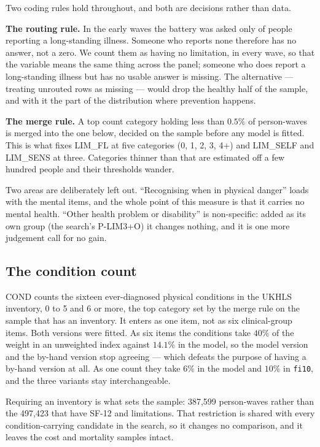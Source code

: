 \documentclass[11pt]{article}
\newcommand{\code}[1]{\texttt{\small #1}}
\begin{document}
Two coding rules hold throughout, and both are decisions rather than data.

\textbf{The routing rule.} In the early waves the battery was asked only of
people reporting a long-standing illness. Someone who reports none therefore
has no answer, not a zero. We count them as having no limitation, in every
wave, so that the variable means the same thing across the panel; someone who
does report a long-standing illness but has no usable answer is missing. The
alternative --- treating unrouted rows as missing --- would drop the healthy
half of the sample, and with it the part of the distribution where prevention
happens.

\textbf{The merge rule.} A top count category holding less than $0.5\%$ of
person-waves is merged into the one below, decided on the sample before any
model is fitted. This is what fixes LIM\_FL at five categories (0, 1, 2, 3, 4+)
and LIM\_SELF and LIM\_SENS at three. Categories thinner than that are
estimated off a few hundred people and their thresholds wander.

Two areas are deliberately left out. ``Recognising when in physical danger''
loads with the mental items, and the whole point of this measure is that it
carries no mental health. ``Other health problem or disability'' is
non-specific: added as its own group (the search's P-LIM3+O) it changes
nothing, and it is one more judgement call for no gain.

\subsection{The condition count}

COND counts the sixteen ever-diagnosed physical conditions in the UKHLS
inventory, 0 to 5 and 6 or more, the top category set by the merge rule on the
sample that has an inventory. It enters as one item, not as six clinical-group
items. Both versions were fitted. As six items the conditions take
$40\%$ of the weight in an unweighted index against $14.1\%$ in the model, so
the model version and the by-hand version stop agreeing --- which defeats the
purpose of having a by-hand version at all. As one count they take $6\%$ in the
model and $10\%$ in \code{fi10}, and the three variants stay interchangeable.

Requiring an inventory is what sets the sample: 387,599 person-waves rather
than the 497,423 that have SF-12 and limitations. That restriction is shared
with every condition-carrying candidate in the search, so it changes no
comparison, and it leaves the cost and mortality samples intact.
\end{document}

